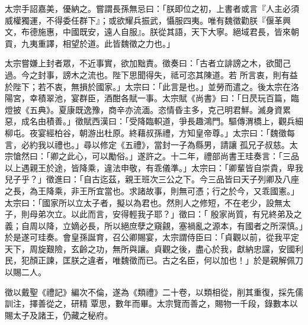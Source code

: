 \begin{pinyinscope}
 太宗手詔嘉美，優納之。嘗謂長孫無忌曰：「朕即位之初，上書者或言『人主必須威權獨運，不得委任群下』；或欲耀兵振武，懾服四夷。唯有魏徵勸朕『偃革興文，布德施惠，中國既安，遠人自服』。朕從其語，天下大寧。絕域君長，皆來朝貢，九夷重譯，相望於道。此皆魏徵之力也。」



 太宗嘗嫌上封者眾，不近事實，欲加黜責。徵奏曰：「古者立誹謗之木，欲聞己過。今之封事，謗木之流也。陛下思聞得失，祗可恣其陳道。若
 所言衷，則有益於陛下；若不衷，無損於國家。」太宗曰：「此言是也。」並勞而遣之。後太宗在洛陽宮，幸積翠池，宴群臣，酒酣各賦一事。太宗賦《尚書》曰：「日昃玩百篇，臨燈披《五典》。夏康既逸豫，商辛亦流湎。恣情昏主多，克己明君鮮。滅身資累惡，成名由積善。」徵賦西漢曰：「受降臨軹道，爭長趣鴻門。驅傳渭橋上，觀兵細柳屯。夜宴經柏谷，朝游出杜原。終藉叔孫禮，方知皇帝尊。」太宗曰：「魏徵每言，必約我以禮也。」尋以修定《五禮》，當封一子為縣男，請讓
 孤兄子叔慈。太宗愴然曰：「卿之此心，可以勵俗。」遂許之。十二年，禮部尚書王珪奏言：「三品以上遇親王於途，皆降乘，違法申敬，有乖儀準。」太宗曰：「卿輩皆自崇貴，卑我兒子乎？」徵進曰：「自古迄茲，親王班次三公之下。今三品皆曰天子列卿及八座之長，為王降乘，非王所宜當也。求諸故事，則無可憑；行之於今，又乖國憲。」太宗曰：「國家所以立太子者，擬以為君也。然則人之修短，不在老少，設無太子，則母弟次立。以此而言，安得輕我子耶？」徵曰：「
 殷家尚質，有兄終弟及之義；自周以降，立嫡必長，所以絕庶孽之窺覦，塞禍亂之源本，有國者之所深慎。」於是遂可珪奏。會皇孫誕育，召公卿賜宴，太宗謂侍臣曰：「貞觀以前，從我平定天下，周旋艱險，玄齡之功，無所與讓。貞觀之後，盡心於我，獻納忠讜，安國利民，犯顏正諫，匡朕之違者，唯魏徵而已。古之名臣，何以加也！」於是親解佩刀以賜二人。



 徵以戴聖《禮記》編次不倫，遂為《類禮》二十卷，以類相從，削其重復，採先儒訓注，擇善從之，研精
 覃思，數年而畢。太宗覽而善之，賜物一千段，錄數本以賜太子及諸王，仍藏之秘府。




\end{pinyinscope}

